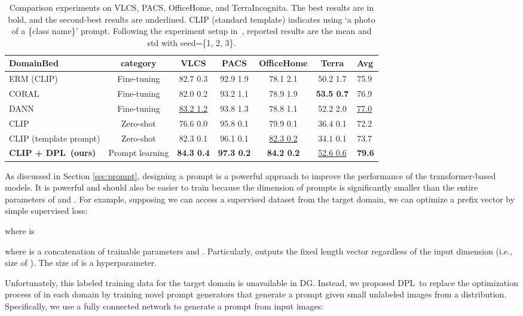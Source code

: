 \documentclass[letterpaper]{article} \usepackage[]{aaai23}
\newcommand{\dplshort}{DPL}
\begin{document}
\begin{table*}[h]
\begin{center}
\begin{tabular}{lc|cccc|l}
\toprule
\textbf{DomainBed} & category & \textbf{VLCS} & \textbf{PACS} & \textbf{OfficeHome} & \textbf{Terra} & \textbf{Avg} \\
\midrule
ERM (CLIP) & Fine-tuning & 82.7  0.3 & 92.9  1.9 & 78.1  2.1 & 50.2  1.7 & 75.9\\
CORAL & Fine-tuning & 82.0  0.2 & 93.2  1.1 & 78.9  1.9 & \textbf{53.5  0.7} & 76.9 \\
DANN & Fine-tuning & \underline{83.2  1.2} & 93.8  1.3 & 78.8  1.1 & 52.2  2.0 & \underline{77.0} \\
\midrule
CLIP & Zero-shot & 76.6  0.0 & 95.8  0.1 & 79.9  0.1 & 36.4  0.1 & 72.2  \\
CLIP (template prompt)& Zero-shot & 82.3  0.1 & 96.1  0.1 & \underline{82.3  0.2} & 34.1  0.1 & 73.7 \\
\textbf{CLIP + \dplshort~(ours)}& Prompt learning & \textbf{84.3  0.4} & \textbf{97.3  0.2} & \textbf{84.2  0.2} & \underline{52.6  0.6} & \textbf{79.6} \\
\midrule
\end{tabular}
\caption{
Comparison experiments on VLCS, PACS, OfficeHome, and TerraIncognita. 
The best results are in bold, and the second-best results are underlined.
CLIP (standard template) indicates using `a photo of a \{class name\}' prompt.
Following the experiment setup in~\cite{iwasawa2021testtime}, reported results are the mean and std with seed=\{1, 2, 3\}.
}
\label{table:main_dg}
\end{center}
\end{table*}

As discussed in Section \ref{sec:prompt}, designing a prompt is a powerful approach to improve the performance of the transformer-based models. 
It is powerful and should also be easier to train because the dimension of prompts is significantly smaller than the entire parameters of  and . 
For example, supposing we can access a supervised dataset from the target domain, we can optimize a prefix vector  by simple supervised loss: 

where  is 

where  is a concatenation of trainable parameters  and . 
Particularly,  outputs the fixed length vector regardless of the input dimension (i.e., size of ). 
The size of  is a hyperparameter. 


Unfortunately, this labeled training data for the target domain is unavailable in DG. 
Instead, we proposed \dplshort~to replace the optimization process of  in each domain by training novel prompt generators  that generate a prompt  given small unlabeled images from a distribution. 
Specifically, we use a fully connected network  to generate a prompt  from input images: 
\end{document}
